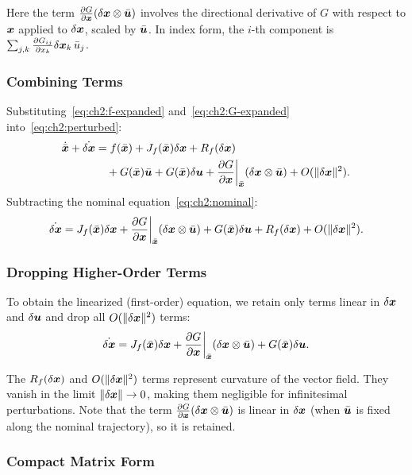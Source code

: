 Here the term $\frac{\partial G}{\partial \bm{x}}(\delta\bm{x}\otimes\bar{\bm{u}})$ involves the directional
derivative of $G$ with respect to $\bm{x}$ applied to $\delta\bm{x}$, scaled by $\bar{\bm{u}}$. In index form,
the $i$-th component is $\sum_{j,k}\frac{\partial G_{ij}}{\partial x_k}\delta\bm{x}_k\,\bar u_j$.

\subsubsection{Combining Terms}

Substituting~\eqref{eq:ch2:f-expanded} and~\eqref{eq:ch2:G-expanded} into~\eqref{eq:ch2:perturbed}:
\begin{align}
\dot{\bar{\bm{x}}} + \dot{\delta\bm{x}} &= f(\bar{\bm{x}}) + J_f(\bar{\bm{x}})\delta\bm{x} + R_f(\delta\bm{x})\\
&\quad+ G(\bar{\bm{x}})\bar{\bm{u}} + G(\bar{\bm{x}})\delta\bm{u} + \frac{\partial G}{\partial \bm{x}}\bigg|_{\bar{\bm{x}}}(\delta\bm{x}\otimes\bar{\bm{u}})
+ O(\|\delta\bm{x}\|^2).
\end{align}
Subtracting the nominal equation~\eqref{eq:ch2:nominal}:
\begin{equation}
\dot{\delta\bm{x}} = J_f(\bar{\bm{x}})\delta\bm{x} + \frac{\partial G}{\partial \bm{x}}\bigg|_{\bar{\bm{x}}}(\delta\bm{x}\otimes\bar{\bm{u}})
+ G(\bar{\bm{x}})\delta\bm{u} + R_f(\delta\bm{x}) + O(\|\delta\bm{x}\|^2).
\label{eq:ch2:diff-before-drop}
\end{equation}

\subsubsection{Dropping Higher-Order Terms}

To obtain the linearized (first-order) equation, we retain only terms linear in $\delta\bm{x}$ and $\delta\bm{u}$
and drop all $O(\|\delta\bm{x}\|^2)$ terms:
\begin{equation}
\dot{\delta\bm{x}} = J_f(\bar{\bm{x}})\delta\bm{x} + \frac{\partial G}{\partial \bm{x}}\bigg|_{\bar{\bm{x}}}(\delta\bm{x}\otimes\bar{\bm{u}})
+ G(\bar{\bm{x}})\delta\bm{u}.
\label{eq:ch2:variational-unsimplified}
\end{equation}

The $R_f(\delta\bm{x})$ and $O(\|\delta\bm{x}\|^2)$ terms represent curvature of the vector field. They vanish
in the limit $\|\delta\bm{x}\|\to 0$, making them negligible for infinitesimal perturbations. Note that
the term $\frac{\partial G}{\partial \bm{x}}(\delta\bm{x}\otimes\bar{\bm{u}})$ is linear in $\delta\bm{x}$ (when $\bar{\bm{u}}$
is fixed along the nominal trajectory), so it is retained.

\subsubsection{Compact Matrix Form}

